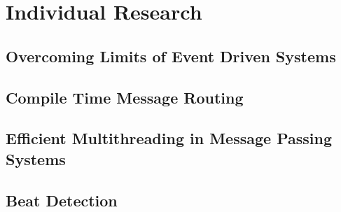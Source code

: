 \documentclass{beamer}
\begin{document}
\section{Individual Research}
\begin{frame}
	\sectionpage
\end{frame}

	\subsection{Overcoming Limits of Event Driven Systems}
	\begin{frame}
		\subsectionpage
	\end{frame}
	
	\subsection{Compile Time Message Routing}
	\begin{frame}
		\subsectionpage
	\end{frame}
	
	\subsection{Efficient Multithreading in Message Passing Systems}
	\begin{frame}
		\subsectionpage
	\end{frame}
	
	\subsection{Beat Detection}
	\begin{frame}
		\subsectionpage
	\end{frame}
\end{document}
